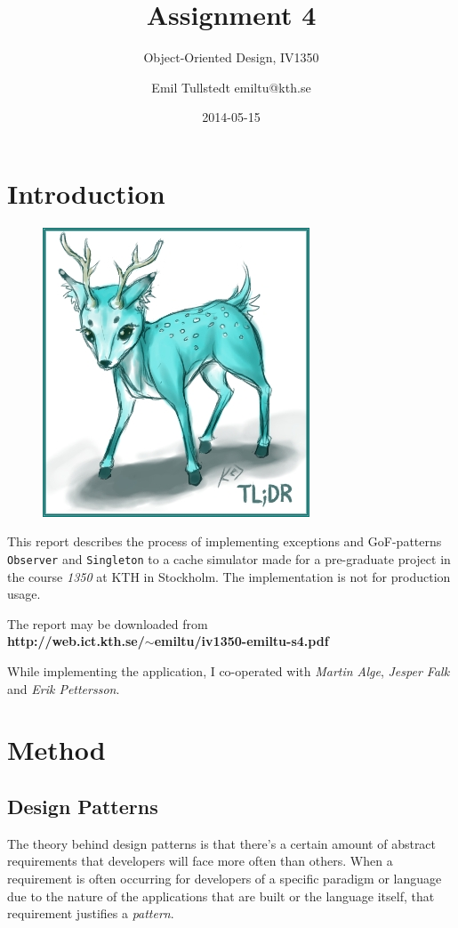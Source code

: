 \documentclass[a4paper]{scrreprt}
\title{Assignment 4}
\subtitle{Object-Oriented Design, IV1350}
\author{Emil Tullstedt emiltu@kth.se}
\date{2014-05-15}
\begin{document}
\maketitle

\tableofcontents %

\chapter{Introduction}

\begin{figure}[h]
  \begin{center}
    \includegraphics[scale=0.5]{tldr.jpg}
  \end{center}
\end{figure}

This report describes the process of implementing exceptions and GoF-patterns \texttt{Observer} and \texttt{Singleton} to a cache simulator made for a pre-graduate project in the course \textit{1350} at KTH in Stockholm. The implementation is not for production usage.

The report may be downloaded from \\\textbf{http://web.ict.kth.se/$\sim$emiltu/iv1350-emiltu-s4.pdf}

\begin{small}
While implementing the application, I co-operated with \textit{Martin Alge}, \textit{Jesper Falk} and \textit{Erik Pettersson}.
\end{small}

\chapter{Method}
\section{Design Patterns}
The theory behind design patterns is that there's a certain amount of abstract requirements that developers will face more often than others. When a requirement is often occurring for developers of a specific paradigm or language due to the nature of the applications that are built or the language itself, that requirement justifies a \textit{pattern}.
\end{document}
